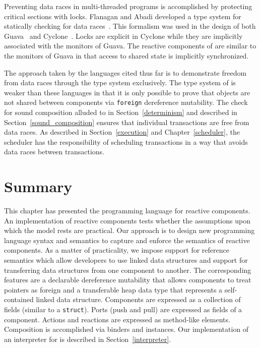 Preventing data races in multi-threaded programs is accomplished by protecting critical sections with locks.
Flanagan and Abadi developed a type system for statically checking for data races~\cite{Flanagan:1999:OTA:646734.701453, Abadi:2006:TSL:1119479.1119480}.
This formalism was used in the design of both Guava~\cite{Bacon:2000:GDJ:353171.353197} and Cyclone~\cite{Grossman:2003:TMC:604174.604177}.
Locks are explicit in Cyclone while they are implicitly associated with the monitors of Guava.
The reactive components of \rcgo{} are similar to the monitors of Guava in that access to shared state is implicitly synchronized.

The approach taken by the languages cited thus far is to demonstrate freedom from data races through the type system exclusively.
The type system of \rcgo{} is weaker than these languages in that it is only possible to prove that objects are not shared between components via \verb+foreign+ dereference mutability.
The check for sound composition alluded to in Section~\ref{determinism} and described in Section~\ref{sound_composition} ensures that individual transactions are free from data races.
As described in Section~\ref{execution} and Chapter~\ref{scheduler}, the scheduler has the responsibility of scheduling transactions in a way that avoids data races between transactions.

\section{Summary}
This chapter has presented the \rcgo programming language for reactive components.
An implementation of reactive components tests whether the assumptions upon which the model rests are practical.
Our approach is to design new programming language syntax and semantics to capture and enforce the semantics of reactive components.
As a matter of practicality, we impose support for reference semantics which allow developers to use linked data structures and support for transferring data structures from one component to another.
The corresponding features are a declarable dereference mutability that allows components to treat pointers as foreign and a transferable heap data type that represents a self-contained linked data structure.
Components are expressed as a collection of fields (similar to a \verb+struct+).
Ports (push and pull) are expressed as fields of a component.
Actions and reactions are expressed as method-like elements.
Composition is accomplished via binders and instances.
Our implementation of an interpreter for \rcgo is described in Section~\ref{interpreter}.

